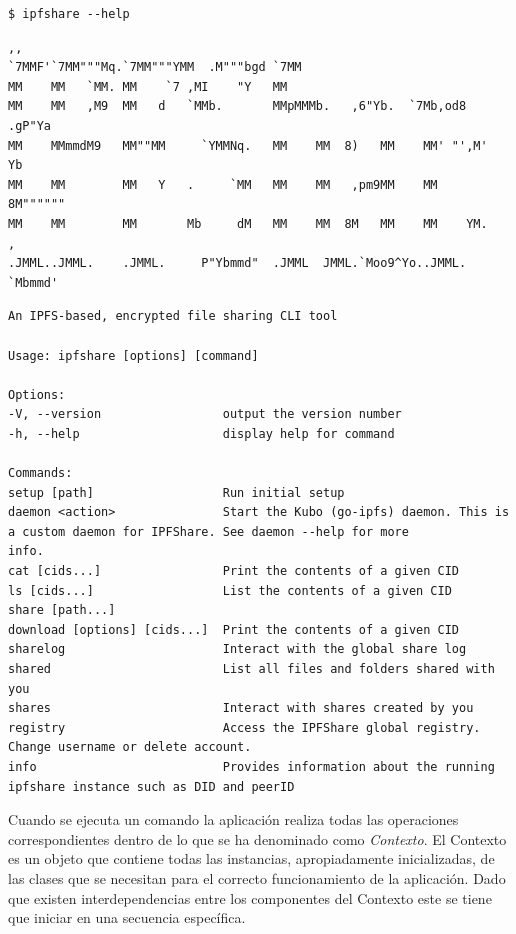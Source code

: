 \begin{verbatim}
$ ipfshare --help
\end{verbatim}
\begin{verbatim}
,,
`7MMF'`7MM"""Mq.`7MM"""YMM  .M"""bgd `7MM
MM    MM   `MM. MM    `7 ,MI    "Y   MM
MM    MM   ,M9  MM   d   `MMb.       MMpMMMb.   ,6"Yb.  `7Mb,od8 .gP"Ya
MM    MMmmdM9   MM""MM     `YMMNq.   MM    MM  8)   MM    MM' "',M'   Yb
MM    MM        MM   Y   .     `MM   MM    MM   ,pm9MM    MM    8M""""""
MM    MM        MM       Mb     dM   MM    MM  8M   MM    MM    YM.    ,
.JMML..JMML.    .JMML.     P"Ybmmd"  .JMML  JMML.`Moo9^Yo..JMML.   `Mbmmd'
\end{verbatim}
\begin{verbatim}
An IPFS-based, encrypted file sharing CLI tool

Usage: ipfshare [options] [command]

Options:
-V, --version                 output the version number
-h, --help                    display help for command

Commands:
setup [path]                  Run initial setup
daemon <action>               Start the Kubo (go-ipfs) daemon. This is a custom daemon for IPFShare. See daemon --help for more
info.
cat [cids...]                 Print the contents of a given CID
ls [cids...]                  List the contents of a given CID
share [path...]
download [options] [cids...]  Print the contents of a given CID
sharelog                      Interact with the global share log
shared                        List all files and folders shared with you
shares                        Interact with shares created by you
registry                      Access the IPFShare global registry. Change username or delete account.
info                          Provides information about the running ipfshare instance such as DID and peerID

\end{verbatim}


Cuando se ejecuta un comando la aplicación realiza todas las operaciones correspondientes dentro de lo que se ha denominado como \textit{Contexto}. El Contexto es un objeto que contiene todas las instancias, apropiadamente inicializadas, de las clases que se necesitan para el correcto funcionamiento de la aplicación. Dado que existen interdependencias entre los componentes del Contexto este se tiene que iniciar en una secuencia específica.

